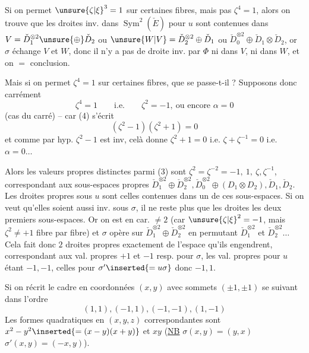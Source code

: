 Si on permet  ${\unsure{\zeta|\xi}}^3=1$ sur certaines fibres,   mais pas $\zeta^4=1$, alors on trouve que les droites inv. dans $\operatorname{Sym}^2(\check E)$ pour $u$ sont contenues  dans $V=\check D_1^{\otimes2}\unsure{\oplus}\check D_2$ ou $\unsure{W|V}=\check D_2^{\otimes2}\oplus\check D_1$ ou $\check D_0^{\otimes2}\oplus\check D_1\otimes\check D_2$, or $\sigma$ échange $V$ et $W$, donc il n'y a pas de droite inv. par $\Phi$ ni dans $V$, ni dans $W$, et on  $=$ conclusion.

Mais si on permet $\zeta^4=1$ sur certaines fibres, que se passe-t-il ? Supposons donc carrément 
\[
\zeta^4=1\qquad\text{i.e.}\qquad\zeta^2=-1,\ \text{ou encore }\alpha=0
\tag*{(4)}
\]
(cas du carré) -- car (4) s'écrit
\[
(\zeta^2-1)(\zeta^2+1)=0
\]
et comme par hyp. $\zeta^2-1$ est inv, celà donne $\zeta^2+1=0$ i.e. $\zeta+\zeta^{-1}=0$ i.e. $\alpha=0\ldots$

Alors les valeurs propres distinctes parmi (3) sont $\zeta^2=\zeta^{-2}=-1,\ 1,\ \zeta,\zeta^{-1}$, correspondant aux sous-espaces propres $\check D_1^{\otimes2}\oplus\check D_2^{\otimes2},\check D_0^{\otimes2}\oplus(D_1\otimes D_2),\check D_1,\check D_2$. Les droites propres
sous $u$ sont celles contenues dans un de ces sous-espaces. Si on veut qu'elles soient aussi inv. sous $\sigma$, il ne reste plus que les droites  les deux premiers sous-espaces. Or on est en car. $\ne2$ (car ${\unsure{\zeta|\xi}}^2=-1$, mais $\zeta^2\ne+1$ fibre par fibre) et $\sigma$ opère sur $\check D_1^{\otimes2}\oplus\check D_2^{\otimes2}$ en permutant $\check D_1^{\otimes2}$ et $\check D_2^{\otimes2}\ldots$ Cela fait donc $2$ droites propres exactement de l'espace qu'ils engendrent, correspondant aux val. propres $+1$ et $-1$ resp. pour $\sigma$, les val. propres pour $u$ étant $-1,-1$, celles pour $\sigma'\inserted{=u\sigma}$  donc $-1,1$.

Si on  récrit le cadre en coordonnées $(x,y)$ avec sommets $(\pm1,\pm1)$  se suivant dans l'ordre
\[
(1,1),(-1,1),(-1,-1),(1,-1)
\]
Les formes quadratiques en $(x,y,z)$ correspondantes sont $x^2-y^2\inserted{=(x-y)(x+y)}$ et $xy$ (\uline{NB} $\sigma(x,y)=(y,x)$ $\sigma'(x,y)=(-x,y)$).

